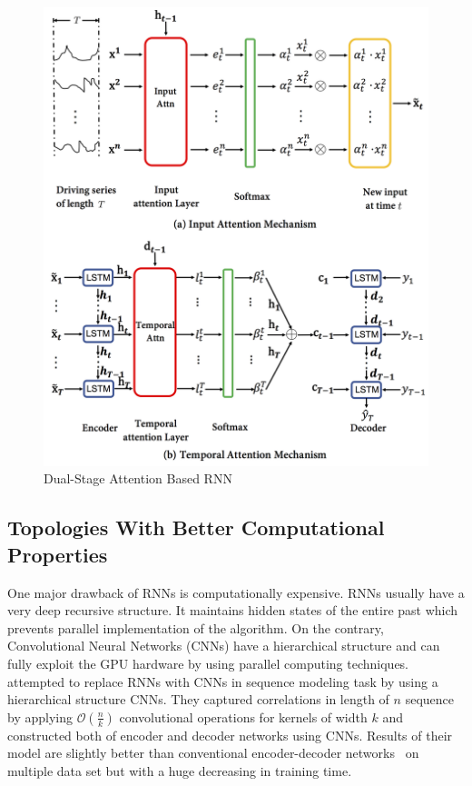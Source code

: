 \message{ !name(usyd_phd_proposal.tex)}\documentclass{article} \usepackage{tabularx}
\renewcommand{\citename}{\citet} \renewcommand{\cite}{\citep}
\begin{document}
\begin{figure}[H]
  \centering
  \includegraphics[scale=0.3]{images/darnn.png}
  \caption{Dual-Stage Attention Based RNN}
  \label{fig:darnn}
\end{figure}

\subsection{Topologies With Better Computational Properties}
\label{sec:better_comp}

One major drawback of RNNs is computationally expensive. RNNs
usually have a very deep recursive structure. It maintains hidden
states of the entire past which prevents parallel implementation
of the algorithm. On the contrary, Convolutional Neural Networks
(CNNs) have a hierarchical structure and can fully exploit the
GPU hardware by using parallel computing techniques.
\citename{gehring2017convolutional} attempted to replace RNNs
with CNNs in sequence modeling task by using a hierarchical
structure CNNs. They captured correlations in length of $n$
sequence by applying $\mathcal{O}(\frac{n}{k})$ convolutional
operations for kernels of width $k$ and constructed both of
encoder and decoder networks using CNNs. Results of their model
are slightly better than conventional encoder-decoder
networks~\cite{attention} on multiple data set but with a huge
decreasing in training time.
\end{document}
